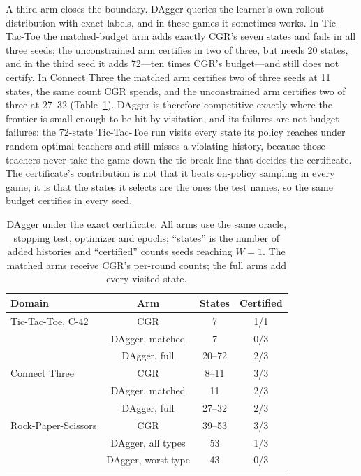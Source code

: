\documentclass[conference]{IEEEtran}
\begin{document}
A third arm closes the boundary. DAgger \cite{ross2011} queries the learner's own rollout distribution with exact labels, and in these games it sometimes works. In Tic-Tac-Toe the matched-budget arm adds exactly CGR's seven states and fails in all three seeds; the unconstrained arm certifies in two of three, but needs 20 states, and in the third seed it adds 72---ten times CGR's budget---and still does not certify. In Connect Three the matched arm certifies two of three seeds at 11 states, the same count CGR spends, and the unconstrained arm certifies two of three at 27--32 (Table~\ref{tab:dagger}). DAgger is therefore competitive exactly where the frontier is small enough to be hit by visitation, and its failures are not budget failures: the 72-state Tic-Tac-Toe run visits every state its policy reaches under random optimal teachers and still misses a violating history, because those teachers never take the game down the tie-break line that decides the certificate. The certificate's contribution is not that it beats on-policy sampling in every game; it is that the states it selects are the ones the test names, so the same budget certifies in every seed.

\begin{table}[t]
\centering
\caption{DAgger under the exact certificate. All arms use the same oracle, stopping test, optimizer and epochs; ``states'' is the number of added histories and ``certified'' counts seeds reaching $W=1$. The matched arms receive CGR's per-round counts; the full arms add every visited state.}
\label{tab:dagger}
\setlength{\tabcolsep}{3pt}
\footnotesize
\begin{tabular}{@{}lccc@{}}
\toprule
\textbf{Domain} & \textbf{Arm} & \textbf{States} & \textbf{Certified} \\
\midrule
Tic-Tac-Toe, C-42 & CGR & 7 & 1/1 \\
 & DAgger, matched & 7 & 0/3 \\
 & DAgger, full & 20--72 & 2/3 \\
\midrule
Connect Three & CGR & 8--11 & 3/3 \\
 & DAgger, matched & 11 & 2/3 \\
 & DAgger, full & 27--32 & 2/3 \\
\midrule
Rock-Paper-Scissors & CGR & 39--53 & 3/3 \\
 & DAgger, all types & 53 & 1/3 \\
 & DAgger, worst type & 43 & 0/3 \\
\bottomrule
\end{tabular}
\end{table}
\end{document}
